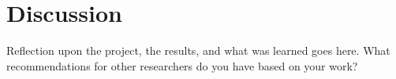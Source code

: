 \section{Discussion}
\label{sec:discussion}

Reflection upon the project, the results, and what was learned goes here. What
recommendations for other researchers do you have based on your work?
